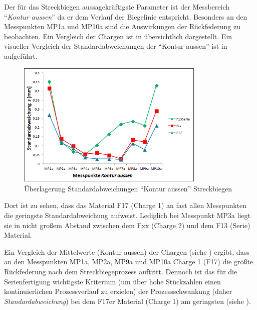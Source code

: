 \documentclass[12pt,a4paper,parskip]{scrartcl}
\begin{document}
Der für das Streckbiegen aussagekräftigste Parameter ist der Messbereich "`\emph{Kontur aussen}"' da er dem Verlauf der Biegelinie entspricht. Besonders an den Messpunkten MP1a und MP10a sind die Auswirkungen der Rückfederung zu beobachten. Ein Vergleich der Chargen ist in  übersichtlich dargestellt. Ein visueller Vergleich der Standardabweichungen der "`Kontur aussen"' ist in  aufgeführt.
\begin{figure}[hbtp]
\centering
\includegraphics[width=0.8\textwidth]{standardstreckb}
\caption{Überlagerung Standardabweichungen "`Kontur aussen"' Streckbiegen}
\label{fig:svstb}
\end{figure}
Dort ist zu sehen, dass das Material F17 (Charge 1) an fast allen Messpunkten die geringste Standardabweichung aufweist. Lediglich bei Messpunkt MP3a liegt sie in nicht großem Abstand zwischen dem Fxx (Charge 2) und dem F13 (Serie) Material.

Ein Vergleich der Mittelwerte (Kontur aussen) der Chargen (siehe  ) ergibt, dass an den Messpunkten MP1a, MP2a, MP9a und MP10a  Charge 1 (F17) die größte Rückfederung nach dem Streckbiegeprozess auftritt. Dennoch ist das für die Serienfertigung wichtigste Kriterium (um über hohe Stückzahlen einen kontinuierlichen Prozessverlauf zu erzielen) der Prozessschwankung (daher \emph{Standardabweichung}) bei dem F17er Material (Charge 1) am geringsten (siehe ).
\end{document}
